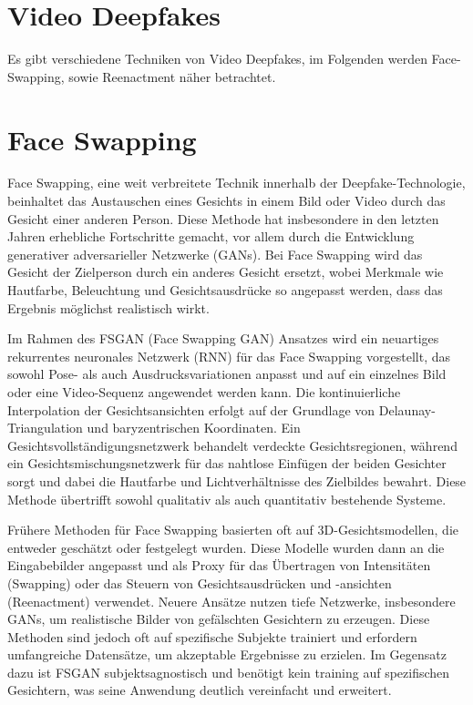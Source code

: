 \section{Video Deepfakes}
\label{sec:video-deepfakes}
Es gibt verschiedene Techniken von Video Deepfakes, im Folgenden werden Face-Swapping, sowie Reenactment näher
betrachtet.

\section{Face Swapping}\label{sec:face-swapping}
Face Swapping, eine weit verbreitete Technik innerhalb der Deepfake-Technologie, beinhaltet das Austauschen eines Gesichts in einem Bild oder Video durch das Gesicht einer anderen Person. Diese Methode hat insbesondere in den letzten Jahren erhebliche Fortschritte gemacht, vor allem durch die Entwicklung generativer adversarieller Netzwerke (GANs). Bei Face Swapping wird das Gesicht der Zielperson durch ein anderes Gesicht ersetzt, wobei Merkmale wie Hautfarbe, Beleuchtung und Gesichtsausdrücke so angepasst werden, dass das Ergebnis möglichst realistisch wirkt.

Im Rahmen des FSGAN (Face Swapping GAN) Ansatzes wird ein neuartiges rekurrentes neuronales Netzwerk (RNN) für das Face Swapping vorgestellt, das sowohl Pose- als auch Ausdrucksvariationen anpasst und auf ein einzelnes Bild oder eine Video-Sequenz angewendet werden kann. Die kontinuierliche Interpolation der Gesichtsansichten erfolgt auf der Grundlage von Delaunay-Triangulation und baryzentrischen Koordinaten. Ein Gesichtsvollständigungsnetzwerk behandelt verdeckte Gesichtsregionen, während ein Gesichtsmischungsnetzwerk für das nahtlose Einfügen der beiden Gesichter sorgt und dabei die Hautfarbe und Lichtverhältnisse des Zielbildes bewahrt. Diese Methode übertrifft sowohl qualitativ als auch quantitativ bestehende Systeme.

Frühere Methoden für Face Swapping basierten oft auf 3D-Gesichtsmodellen, die entweder geschätzt oder festgelegt wurden. Diese Modelle wurden dann an die Eingabebilder angepasst und als Proxy für das Übertragen von Intensitäten (Swapping) oder das Steuern von Gesichtsausdrücken und -ansichten (Reenactment) verwendet. Neuere Ansätze nutzen tiefe Netzwerke, insbesondere GANs, um realistische Bilder von gefälschten Gesichtern zu erzeugen. Diese Methoden sind jedoch oft auf spezifische Subjekte trainiert und erfordern umfangreiche Datensätze, um akzeptable Ergebnisse zu erzielen. Im Gegensatz dazu ist FSGAN subjektsagnostisch und benötigt kein training auf spezifischen Gesichtern, was seine Anwendung deutlich vereinfacht und erweitert\cite{face-swapping-and-reenactment}.

